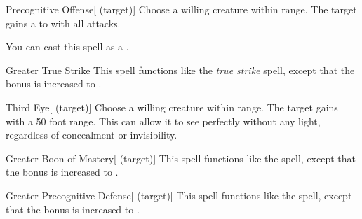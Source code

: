 \lowercase{\hypertarget{spell:Precognitive Offense}{}}\label{spell:Precognitive Offense}
\begin{attuneability}[\nth{2}]{\hypertarget{spell:Precognitive Offense}{Precognitive Offense}}[ (target)]
Choose a willing creature within \rngclose range.
The target gains a   to  with all attacks.

You can cast this spell as a .
\end{attuneability}
\vspace{0.25em}



\lowercase{\hypertarget{spell:Greater True Strike}{}}\label{spell:Greater True Strike}
\begin{apability}[\nth{3}]{\hypertarget{spell:Greater True Strike}{Greater True Strike}}
This spell functions like the \textit{true strike} spell, except that the bonus is increased to .
\end{apability}
\vspace{0.25em}



\lowercase{\hypertarget{spell:Third Eye}{}}\label{spell:Third Eye}
\begin{attuneability}[\nth{3}]{\hypertarget{spell:Third Eye}{Third Eye}}[ (target)]
Choose a willing creature within \rngclose range.
The target gains  with a 50 foot range.
This can allow it to see perfectly without any light, regardless of concealment or invisibility.
\end{attuneability}
\vspace{0.25em}



\lowercase{\hypertarget{spell:Greater Boon of Mastery}{}}\label{spell:Greater Boon of Mastery}
\begin{attuneability}[\nth{4}]{\hypertarget{spell:Greater Boon of Mastery}{Greater Boon of Mastery}}[ (target)]
This spell functions like the  spell, except that the bonus is increased to .
\end{attuneability}
\vspace{0.25em}



\lowercase{\hypertarget{spell:Greater Precognitive Defense}{}}\label{spell:Greater Precognitive Defense}
\begin{attuneability}[\nth{4}]{\hypertarget{spell:Greater Precognitive Defense}{Greater Precognitive Defense}}[ (target)]
This spell functions like the  spell, except that the bonus is increased to .
\end{attuneability}
\vspace{0.25em}



